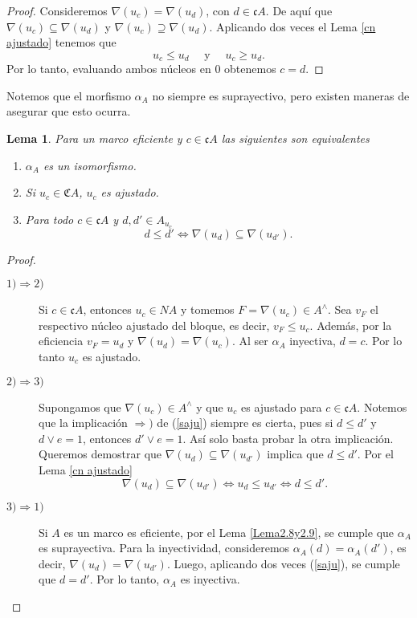 \documentclass[11pt]{amsart}
\theoremstyle{plain}
\newtheorem{lem}[thm]{Lema}
\theoremstyle{definition}
\begin{document}
\begin{proof}
    Consideremos $\nabla(u_c)=\nabla(u_d)$, con $d\in \mathfrak{c}A$. De aquí que $\nabla(u_c)\subseteq \nabla(u_d)$ y $\nabla(u_c)\supseteq\nabla(u_d)$. Aplicando dos veces el Lema \ref{cn ajustado} tenemos que 
    \[
    u_c\leq u_d\quad\mbox{ y }\quad u_c\geq u_d.
    \]
    Por lo tanto, evaluando ambos núcleos en $0$ obtenemos $c=d$.
\end{proof}

Notemos que el morfismo $\alpha_A$ no siempre es suprayectivo, pero existen maneras de asegurar que esto ocurra.

\begin{lem}\label{Lema2.7}
    Para un marco eficiente y $c\in \mathfrak{c}A$ las siguientes son equivalentes
    \begin{enumerate}
        \item $\alpha_A$ es un isomorfismo.
        \item Si $u_c\in \mathfrak{C}A$, $u_c$ es ajustado.
        \item Para todo $c\in \mathfrak{c}A$ y $d, d'\in A_{u_c}$
        \begin{equation}\label{saju}
            d\leq d'\Leftrightarrow \nabla(u_d)\subseteq \nabla(u_{d'}).
        \end{equation}
    \end{enumerate}
\end{lem}

\begin{proof}
\begin{description}
        \item[$1)\Rightarrow 2)$] Si $c\in \mathfrak{c}A$, entonces $u_c\in NA$ y tomemos $F=\nabla(u_c)\in A^\wedge$. Sea $v_F$ el respectivo núcleo ajustado del bloque, es decir, $v_F\leq u_c$. Además, por la eficiencia $v_F=u_d$ y  $\nabla(u_d)=\nabla(u_c)$. Al ser $\alpha_A$ inyectiva, $d=c$. Por lo tanto $u_c$ es ajustado. 

        \item[$2)\Rightarrow 3)$] Supongamos que $\nabla(u_c)\in A^\wedge$ y que $u_c$ es ajustado para $c\in \mathfrak{c}A$. Notemos que la implicación $\Rightarrow)$ de (\ref{saju}) siempre es cierta, pues si $d\leq d'$ y $d\vee e=1$, entonces $d'\vee e=1$. Así solo basta probar la otra implicación.\\

        Queremos demostrar que $\nabla(u_d)\subseteq \nabla(u_{d'})$ implica que $d\leq d'$. Por el Lema \ref{cn ajustado}
        \[
        \nabla(u_d)\subseteq \nabla(u_{d'})\Leftrightarrow u_d\leq u_{d'}\Leftrightarrow d\leq d'.
        \]

        \item[$3)\Rightarrow 1)$] Si $A$ es un marco es eficiente, por el Lema \ref{Lema2.8y2.9}, se cumple que $\alpha_A$ es suprayectiva. Para la inyectividad, consideremos $\alpha_A(d)=\alpha_A(d')$, es decir, $\nabla(u_d)=\nabla(u_{d'})$. Luego, aplicando dos veces (\ref{saju}), se cumple que $d=d'$. Por lo tanto, $\alpha_A$ es inyectiva.
    \end{description}
\end{proof}
\end{document}
